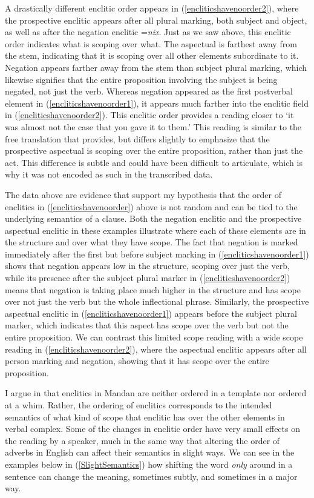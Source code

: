 A drastically different enclitic order appears in (\ref{encliticshavenoorder2}), where the prospective enclitic appears after all plural marking, both subject and object, as well as after the negation enclitic =\textit{nix}. Just as we saw above, this enclitic order indicates what is scoping over what. The aspectual is farthest away from the stem, indicating that it is scoping over all other elements subordinate to it. Negation appears farther away from the stem than subject plural marking, which likewise signifies that the entire proposition involving the subject is being negated, not just the verb. Whereas negation appeared as the first postverbal element in (\ref{encliticshavenoorder1}), it appears much farther into the enclitic field in (\ref{encliticshavenoorder2}). This enclitic order provides a reading closer to `it was almost not the case that you gave it to them.' This reading is similar to the free translation that \citet[468]{hollow1970} provides, but differs slightly to emphasize that the prospective aspectual is scoping over the entire proposition, rather than just the act. This difference is subtle and could have been difficult to articulate, which is why it was not encoded as such in the transcribed data.

The data above are evidence that support my hypothesis that the order of enclitics in (\ref{encliticshavenoorder}) above is not random and can be tied to the underlying semantics of a clause. Both the negation enclitic and the prospective aspectual enclitic in these examples illustrate where each of these elements are in the structure and over what they have scope. The fact that negation is marked immediately after the first but before subject marking in (\ref{encliticshavenoorder1}) shows that negation appears low in the structure, scoping over just the verb, while its presence after the subject plural marker in (\ref{encliticshavenoorder2}) means that negation is taking place much higher in the structure and has scope over not just the verb but the whole inflectional phrase. Similarly, the prospective aspectual enclitic in (\ref{encliticshavenoorder1}) appears before the subject plural marker, which indicates that this aspect has scope over the verb but not the entire proposition. We can contrast this limited scope reading with a wide scope reading in (\ref{encliticshavenoorder2}), where the aspectual enclitic appears after all person marking and negation, showing that it has scope over the entire proposition.

I argue in \citet{kasak2019} that enclitics in Mandan are neither ordered in a template nor ordered at a whim. Rather, the ordering of enclitics corresponds to the intended semantics of what kind of scope that enclitic has over the other elements in verbal complex. Some of the changes in enclitic order have very small effects on the reading by a speaker, much in the same way that altering the order of adverbs in English can affect their semantics in slight ways. We can see in the examples below in (\ref{SlightSemantics}) how shifting the word \textit{only} around in a sentence can change the meaning, sometimes subtly, and sometimes in a major way.

